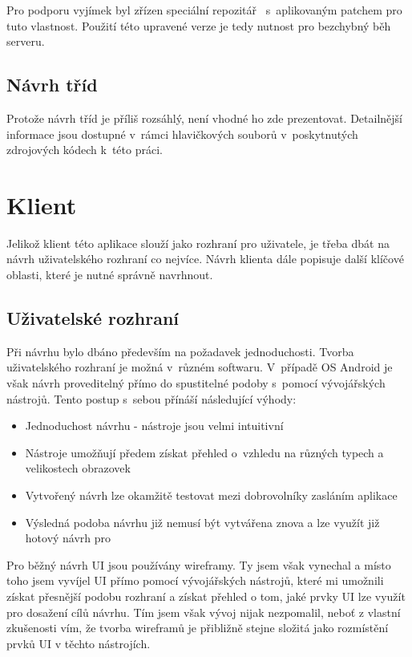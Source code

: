 \documentclass[thesis=B,czech]{FITthesis}[2013/10/20]
\begin{document}
Pro podporu vyjímek byl zřízen speciální repozitář~\cite{json_ex_repo} s~aplikovaným patchem pro tuto vlastnost. Použití této upravené verze je tedy nutnost pro bezchybný běh serveru.

\subsection{Návrh tříd}

Protože návrh tříd je příliš rozsáhlý, není vhodné ho zde prezentovat. Detailnější informace jsou dostupné v~rámci hlavičkových souborů v~poskytnutých zdrojových kódech k~této práci.

\section{Klient}

Jelikož klient této aplikace slouží jako rozhraní pro uživatele, je třeba dbát na návrh uživatelského rozhraní co nejvíce. Návrh klienta dále popisuje další klíčové oblasti, které je nutné správně navrhnout.

\subsection{Uživatelské rozhraní}

Při návrhu bylo dbáno především na požadavek jednoduchosti. Tvorba uživatelského rozhraní je možná v~různém softwaru. V~případě OS Android je však návrh proveditelný přímo do spustitelné podoby s~pomocí vývojářských nástrojů. Tento postup s~sebou přínáší následující výhody:

\begin{itemize}
  \item{Jednoduchost návrhu - nástroje jsou velmi intuitivní}
  \item{Nástroje umožňují předem získat přehled o~vzhledu na různých typech a velikostech obrazovek}
  \item{Vytvořený návrh lze okamžitě testovat mezi dobrovolníky zasláním aplikace}
  \item{Výsledná podoba návrhu již nemusí být vytvářena znova a lze využít již hotový návrh pro}
\end{itemize}

Pro běžný návrh UI jsou používány wireframy. Ty jsem však vynechal a místo toho jsem vyvíjel UI přímo pomocí vývojářských nástrojů, které mi umožnili získat přesnější podobu rozhraní a získat přehled o tom, jaké prvky UI lze využít pro dosažení cílů návrhu. Tím jsem však vývoj nijak nezpomalil, neboť z vlastní zkušenosti vím, že tvorba wireframů je přibližně stejne složitá jako rozmístění prvků UI v těchto nástrojích.
\end{document}
